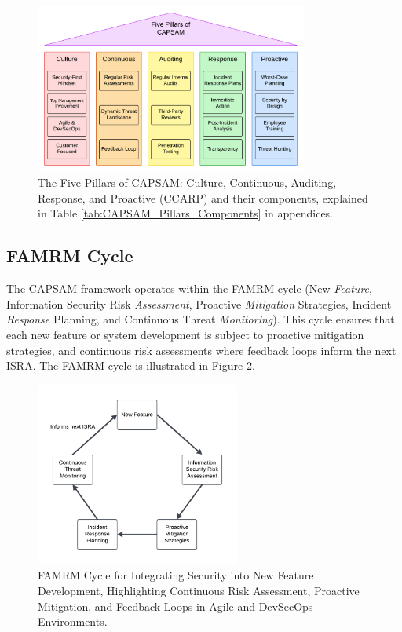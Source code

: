     \begin{figure}[htbp]
        \centering
        \includegraphics[width=0.8\textwidth]{figures/CAPSAM-Pillars.png}
        \caption{The Five Pillars of CAPSAM: Culture, Continuous, Auditing, Response, and Proactive (CCARP) and their components, explained in Table \ref{tab:CAPSAM_Pillars_Components} in appendices.}
        \label{fig:CAPSAM_Pillars}
    \end{figure}

    \subsection{FAMRM Cycle}
    The CAPSAM framework operates within the FAMRM cycle (New \textit{Feature}, Information Security Risk \textit{Assessment}, Proactive \textit{Mitigation} Strategies, Incident \textit{Response} Planning, and Continuous Threat \textit{Monitoring}). This cycle ensures that each new feature or system development is subject to proactive mitigation strategies, and continuous risk assessments where feedback loops inform the next ISRA. The FAMRM cycle is illustrated in Figure \ref{fig:FAMRM_Cycle}.

    \begin{figure}[htbp]
        \centering
        \includegraphics[width=0.6\textwidth]{figures/FAMRM-Cycle.png}
        \caption{FAMRM Cycle for Integrating Security into New Feature Development, Highlighting Continuous Risk Assessment, Proactive Mitigation, and Feedback Loops in Agile and DevSecOps Environments.}
        \label{fig:FAMRM_Cycle}
    \end{figure}

